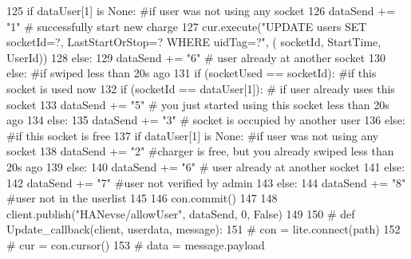 \begin{DoxyCode}
125                     \textcolor{keywordflow}{if} dataUser[1] \textcolor{keywordflow}{is} \textcolor{keywordtype}{None}: \textcolor{comment}{#if user was not using any socket}
126                         dataSend += \textcolor{stringliteral}{"1"} \textcolor{comment}{# successfully start new charge}
127                         cur.execute(\textcolor{stringliteral}{"UPDATE users SET socketId=?, LastStartOrStop=? WHERE uidTag=?"}, (
      socketId, StartTime, UserId))
128                     \textcolor{keywordflow}{else}:
129                         dataSend += \textcolor{stringliteral}{"6"} \textcolor{comment}{# user already at another socket}
130             \textcolor{keywordflow}{else}: \textcolor{comment}{#if swiped less than 20s ago}
131                 \textcolor{keywordflow}{if} (socketUsed == socketId): \textcolor{comment}{#if this socket is used now}
132                     \textcolor{keywordflow}{if} (socketId == dataUser[1]): \textcolor{comment}{# if user already uses this socket}
133                         dataSend += \textcolor{stringliteral}{"5"} \textcolor{comment}{# you just started using this socket less than 20s ago}
134                     \textcolor{keywordflow}{else}:
135                         dataSend += \textcolor{stringliteral}{"3"} \textcolor{comment}{# socket is occupied by another user}
136                 \textcolor{keywordflow}{else}: \textcolor{comment}{#if this socket is free}
137                     \textcolor{keywordflow}{if} dataUser[1] \textcolor{keywordflow}{is} \textcolor{keywordtype}{None}: \textcolor{comment}{#if user was not using any socket}
138                         dataSend += \textcolor{stringliteral}{"2"} \textcolor{comment}{#charger is free, but you already swiped less than 20s ago}
139                     \textcolor{keywordflow}{else}:
140                         dataSend += \textcolor{stringliteral}{"6"}  \textcolor{comment}{# user already at another socket}
141         \textcolor{keywordflow}{else}:
142              dataSend += \textcolor{stringliteral}{"7"} \textcolor{comment}{#user not verified by admin           }
143     \textcolor{keywordflow}{else}:
144         dataSend += \textcolor{stringliteral}{"8"} \textcolor{comment}{#user not in the userlist}
145     
146     con.commit()
147     
148     client.publish(\textcolor{stringliteral}{"HANevse/allowUser"}, dataSend, 0, \textcolor{keyword}{False})
149 
150 \textcolor{comment}{# def Update\_callback(client, userdata, message):}
151 \textcolor{comment}{#     con = lite.connect(path)}
152 \textcolor{comment}{#     cur = con.cursor()}
153 \textcolor{comment}{#     data = message.payload}

\end{DoxyCode}
